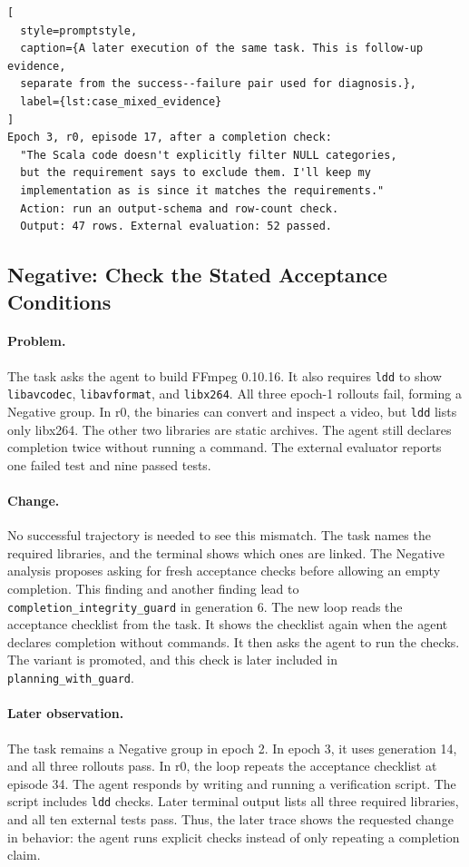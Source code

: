 \documentclass{article} %
\begin{document}
\begin{lstlisting}[
  style=promptstyle,
  caption={A later execution of the same task. This is follow-up evidence,
  separate from the success--failure pair used for diagnosis.},
  label={lst:case_mixed_evidence}
]
Epoch 3, r0, episode 17, after a completion check:
  "The Scala code doesn't explicitly filter NULL categories,
  but the requirement says to exclude them. I'll keep my
  implementation as is since it matches the requirements."
  Action: run an output-schema and row-count check.
  Output: 47 rows. External evaluation: 52 passed.
\end{lstlisting}

\subsection{Negative: Check the Stated Acceptance Conditions}

\paragraph{Problem.}
The task asks the agent to build FFmpeg 0.10.16.
It also requires \texttt{ldd} to show \texttt{libavcodec},
\texttt{libavformat}, and \texttt{libx264}. All three epoch-1 rollouts fail,
forming a Negative group. In r0, the binaries can convert and inspect a
video, but \texttt{ldd} lists only libx264. The other two libraries are
static archives. The agent still declares completion twice without running
a command. The external evaluator reports one failed test and nine passed
tests.

\paragraph{Change.}
No successful trajectory is needed to see this mismatch.
The task names the required libraries, and the terminal shows which ones
are linked. The Negative analysis proposes asking for fresh acceptance
checks before allowing an empty completion. This finding and another finding
lead to \texttt{completion\_integrity\_guard} in generation 6.
The new loop reads the acceptance checklist from the task.
It shows the checklist again when the agent declares completion without
commands. It then asks the agent to run the checks. The variant is promoted,
and this check is later included in \texttt{planning\_with\_guard}.

\paragraph{Later observation.}
The task remains a Negative group in epoch 2. In epoch 3, it uses
generation 14, and all three rollouts pass. In r0, the loop repeats the
acceptance checklist at episode 34. The agent responds by writing and running
a verification script. The script includes \texttt{ldd} checks.
Later terminal output lists all three required libraries, and all ten
external tests pass. Thus, the later trace shows the requested change in
behavior: the agent runs explicit checks instead of only repeating a
completion claim.
\end{document}
